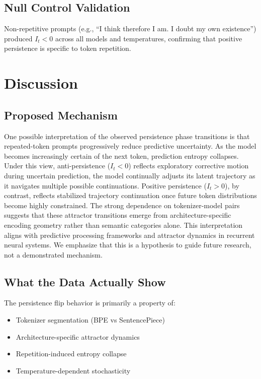 \documentclass[12pt,a4paper]{article}
\begin{document}
\subsection{Null Control Validation}

Non-repetitive prompts (e.g., ``I think therefore I am. I doubt my own existence'') produced $I_t < 0$ across all models and temperatures, confirming that positive persistence is specific to token repetition.

\section{Discussion}

\subsection{Proposed Mechanism}

One possible interpretation of the observed persistence phase transitions is that repeated-token prompts progressively reduce predictive uncertainty. As the model becomes increasingly certain of the next token, prediction entropy collapses. Under this view, anti-persistence ($I_t < 0$) reflects exploratory corrective motion during uncertain prediction, the model continually adjusts its latent trajectory as it navigates multiple possible continuations. Positive persistence ($I_t > 0$), by contrast, reflects stabilized trajectory continuation once future token distributions become highly constrained. The strong dependence on tokenizer-model pairs suggests that these attractor transitions emerge from architecture-specific encoding geometry rather than semantic categories alone. This interpretation aligns with predictive processing frameworks and attractor dynamics in recurrent neural systems. We emphasize that this is a hypothesis to guide future research, not a demonstrated mechanism.

\subsection{What the Data Actually Show}

The persistence flip behavior is primarily a property of:

\begin{itemize}[noitemsep]
    \item Tokenizer segmentation (BPE vs SentencePiece)
    \item Architecture-specific attractor dynamics
    \item Repetition-induced entropy collapse
    \item Temperature-dependent stochasticity
\end{itemize}
\end{document}
